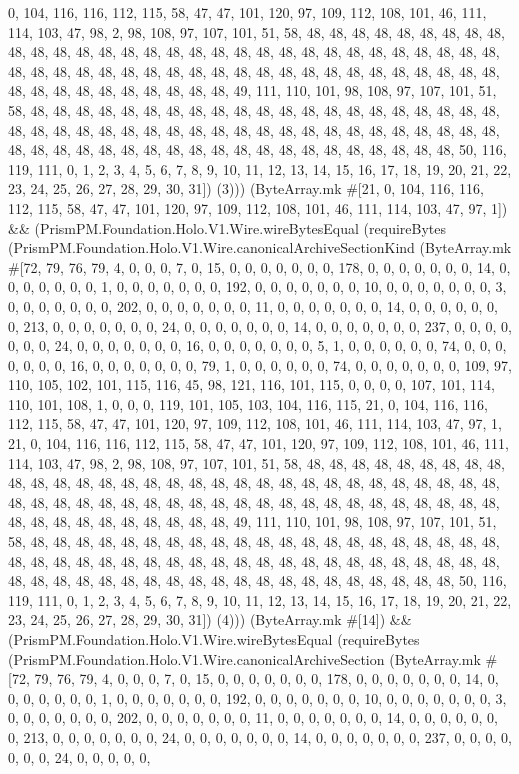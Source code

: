 \documentclass[11pt]{article}
\begin{document}
0, 104, 116, 116, 112, 115, 58, 47, 47, 101, 120, 97, 109, 112, 108, 101, 46, 111, 114, 103, 47, 98, 2, 98, 108, 97, 107, 101, 51, 58, 48, 48, 48, 48, 48, 48, 48, 48, 48, 48, 48, 48, 48, 48, 48, 48, 48, 48, 48, 48, 48, 48, 48, 48, 48, 48, 48, 48, 48, 48, 48, 48, 48, 48, 48, 48, 48, 48, 48, 48, 48, 48, 48, 48, 48, 48, 48, 48, 48, 48, 48, 48, 48, 48, 48, 48, 48, 48, 48, 48, 48, 48, 48, 49, 111, 110, 101, 98, 108, 97, 107, 101, 51, 58, 48, 48, 48, 48, 48, 48, 48, 48, 48, 48, 48, 48, 48, 48, 48, 48, 48, 48, 48, 48, 48, 48, 48, 48, 48, 48, 48, 48, 48, 48, 48, 48, 48, 48, 48, 48, 48, 48, 48, 48, 48, 48, 48, 48, 48, 48, 48, 48, 48, 48, 48, 48, 48, 48, 48, 48, 48, 48, 48, 48, 48, 48, 48, 50, 116, 119, 111, 0, 1, 2, 3, 4, 5, 6, 7, 8, 9, 10, 11, 12, 13, 14, 15, 16, 17, 18, 19, 20, 21, 22, 23, 24, 25, 26, 27, 28, 29, 30, 31]) (3))) (ByteArray.mk \#[21, 0, 104, 116, 116, 112, 115, 58, 47, 47, 101, 120, 97, 109, 112, 108, 101, 46, 111, 114, 103, 47, 97, 1]) \&\& (PrismPM.Foundation.Holo.V1.Wire.wireBytesEqual (requireBytes (PrismPM.Foundation.Holo.V1.Wire.canonicalArchiveSectionKind (ByteArray.mk \#[72, 79, 76, 79, 4, 0, 0, 0, 7, 0, 15, 0, 0, 0, 0, 0, 0, 0, 178, 0, 0, 0, 0, 0, 0, 0, 14, 0, 0, 0, 0, 0, 0, 0, 1, 0, 0, 0, 0, 0, 0, 0, 192, 0, 0, 0, 0, 0, 0, 0, 10, 0, 0, 0, 0, 0, 0, 0, 3, 0, 0, 0, 0, 0, 0, 0, 202, 0, 0, 0, 0, 0, 0, 0, 11, 0, 0, 0, 0, 0, 0, 0, 14, 0, 0, 0, 0, 0, 0, 0, 213, 0, 0, 0, 0, 0, 0, 0, 24, 0, 0, 0, 0, 0, 0, 0, 14, 0, 0, 0, 0, 0, 0, 0, 237, 0, 0, 0, 0, 0, 0, 0, 24, 0, 0, 0, 0, 0, 0, 0, 16, 0, 0, 0, 0, 0, 0, 0, 5, 1, 0, 0, 0, 0, 0, 0, 74, 0, 0, 0, 0, 0, 0, 0, 16, 0, 0, 0, 0, 0, 0, 0, 79, 1, 0, 0, 0, 0, 0, 0, 74, 0, 0, 0, 0, 0, 0, 0, 109, 97, 110, 105, 102, 101, 115, 116, 45, 98, 121, 116, 101, 115, 0, 0, 0, 0, 107, 101, 114, 110, 101, 108, 1, 0, 0, 0, 119, 101, 105, 103, 104, 116, 115, 21, 0, 104, 116, 116, 112, 115, 58, 47, 47, 101, 120, 97, 109, 112, 108, 101, 46, 111, 114, 103, 47, 97, 1, 21, 0, 104, 116, 116, 112, 115, 58, 47, 47, 101, 120, 97, 109, 112, 108, 101, 46, 111, 114, 103, 47, 98, 2, 98, 108, 97, 107, 101, 51, 58, 48, 48, 48, 48, 48, 48, 48, 48, 48, 48, 48, 48, 48, 48, 48, 48, 48, 48, 48, 48, 48, 48, 48, 48, 48, 48, 48, 48, 48, 48, 48, 48, 48, 48, 48, 48, 48, 48, 48, 48, 48, 48, 48, 48, 48, 48, 48, 48, 48, 48, 48, 48, 48, 48, 48, 48, 48, 48, 48, 48, 48, 48, 48, 49, 111, 110, 101, 98, 108, 97, 107, 101, 51, 58, 48, 48, 48, 48, 48, 48, 48, 48, 48, 48, 48, 48, 48, 48, 48, 48, 48, 48, 48, 48, 48, 48, 48, 48, 48, 48, 48, 48, 48, 48, 48, 48, 48, 48, 48, 48, 48, 48, 48, 48, 48, 48, 48, 48, 48, 48, 48, 48, 48, 48, 48, 48, 48, 48, 48, 48, 48, 48, 48, 48, 48, 48, 48, 50, 116, 119, 111, 0, 1, 2, 3, 4, 5, 6, 7, 8, 9, 10, 11, 12, 13, 14, 15, 16, 17, 18, 19, 20, 21, 22, 23, 24, 25, 26, 27, 28, 29, 30, 31]) (4))) (ByteArray.mk \#[14]) \&\& (PrismPM.Foundation.Holo.V1.Wire.wireBytesEqual (requireBytes (PrismPM.Foundation.Holo.V1.Wire.canonicalArchiveSection (ByteArray.mk \#[72, 79, 76, 79, 4, 0, 0, 0, 7, 0, 15, 0, 0, 0, 0, 0, 0, 0, 178, 0, 0, 0, 0, 0, 0, 0, 14, 0, 0, 0, 0, 0, 0, 0, 1, 0, 0, 0, 0, 0, 0, 0, 192, 0, 0, 0, 0, 0, 0, 0, 10, 0, 0, 0, 0, 0, 0, 0, 3, 0, 0, 0, 0, 0, 0, 0, 202, 0, 0, 0, 0, 0, 0, 0, 11, 0, 0, 0, 0, 0, 0, 0, 14, 0, 0, 0, 0, 0, 0, 0, 213, 0, 0, 0, 0, 0, 0, 0, 24, 0, 0, 0, 0, 0, 0, 0, 14, 0, 0, 0, 0, 0, 0, 0, 237, 0, 0, 0, 0, 0, 0, 0, 24, 0, 0, 0, 0, 0, 
\end{document}
